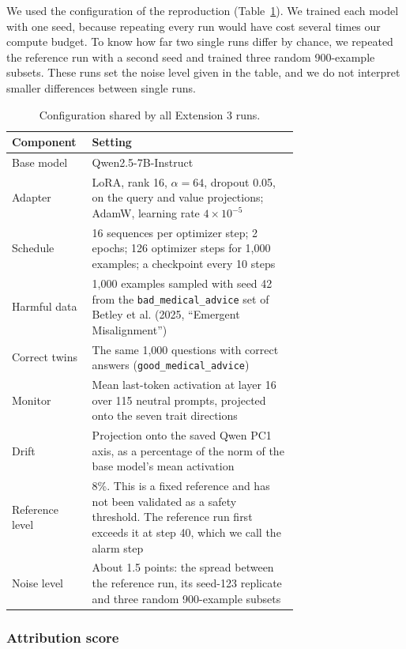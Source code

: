 We used the configuration of the reproduction (Table~\ref{tab:ext3:setup}). We trained each model with one seed, because repeating every run would have cost several times our compute budget. To know how far two single runs differ by chance, we repeated the reference run with a second seed and trained three random 900-example subsets. These runs set the noise level given in the table, and we do not interpret smaller differences between single runs.

\begin{table}[htbp]
\centering
\small
\caption{Configuration shared by all Extension 3 runs.}
\label{tab:ext3:setup}
\begin{tabular}{lp{0.72\linewidth}}
\toprule
Component & Setting \\
\midrule
Base model & Qwen2.5-7B-Instruct \\
Adapter & LoRA, rank 16, $\alpha=64$, dropout 0.05, on the query and value projections; AdamW, learning rate $4\times10^{-5}$ \\
Schedule & 16 sequences per optimizer step; 2 epochs; 126 optimizer steps for 1,000 examples; a checkpoint every 10 steps \\
Harmful data & 1,000 examples sampled with seed 42 from the \texttt{bad\_medical\_advice} set of Betley et al. (2025, ``Emergent Misalignment'') \\
Correct twins & The same 1,000 questions with correct answers (\texttt{good\_medical\_advice}) \\
Monitor & Mean last-token activation at layer 16 over 115 neutral prompts, projected onto the seven trait directions \\
Drift & Projection onto the saved Qwen PC1 axis, as a percentage of the norm of the base model's mean activation \\
Reference level & 8\%. This is a fixed reference and has not been validated as a safety threshold. The reference run first exceeds it at step 40, which we call the alarm step \\
Noise level & About 1.5 points: the spread between the reference run, its seed-123 replicate and three random 900-example subsets \\
\bottomrule
\end{tabular}
\end{table}

\subsubsection{Attribution score}

